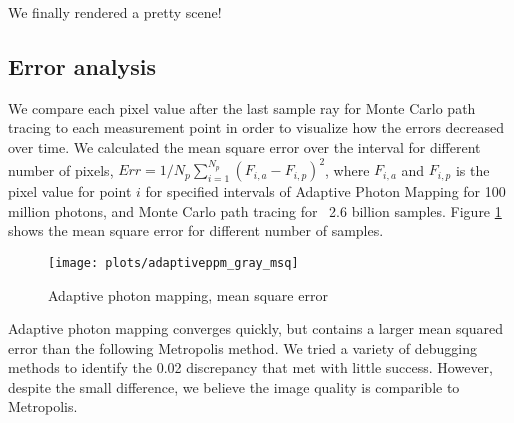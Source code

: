 We finally rendered a pretty scene!

\subsection*{Error analysis}
We compare each pixel value after the last sample ray for Monte Carlo path tracing to each measurement point in order to visualize how the errors decreased over time. We calculated the mean square error over the interval for different number of pixels, $Err = 1/N_p \sum_{i=1}^{N_p} (F_{i,a} - F_{i,p})^2$, where $F_{i,a}$ and $F_{i,p}$ is the pixel value for point $i$ for specified intervals of Adaptive Photon Mapping for 100 million photons, and Monte Carlo path tracing for ~2.6 billion samples. Figure \ref{fig:adaptive_msq} shows the mean square error for different number of samples.

\begin{figure}[H]
    \centering
    \texttt{[image: plots/adaptiveppm\_gray\_msq]}\\
    \caption{Adaptive photon mapping, mean square error}
    \label{fig:adaptive_msq}
\end{figure}

Adaptive photon mapping converges quickly, but contains a larger mean squared error than the following Metropolis method. We tried a variety of debugging methods to identify the 0.02 discrepancy that met with little success. However, despite the small difference, we believe the image quality is comparible to Metropolis. 




